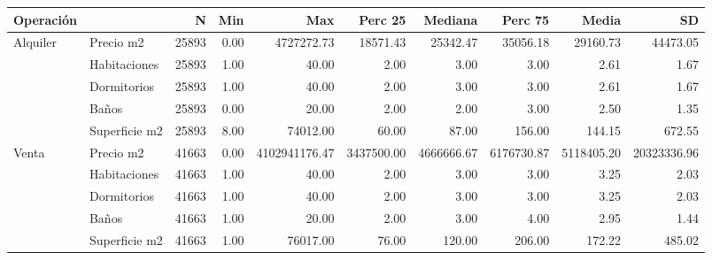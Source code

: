\begin{table}
\centering
\begin{tabular}[t]{llrrrrrrrr}
\toprule
Operación &   & N & Min & Max & Perc 25 & Mediana & Perc 75 & Media & SD\\
\midrule
Alquiler & Precio m2 & 25893 & \num{0.00} & \num{4727272.73} & \num{18571.43} & \num{25342.47} & \num{35056.18} & \num{29160.73} & \num{44473.05}\\
 & Habitaciones & 25893 & \num{1.00} & \num{40.00} & \num{2.00} & \num{3.00} & \num{3.00} & \num{2.61} & \num{1.67}\\
 & Dormitorios & 25893 & \num{1.00} & \num{40.00} & \num{2.00} & \num{3.00} & \num{3.00} & \num{2.61} & \num{1.67}\\
 & Baños & 25893 & \num{0.00} & \num{20.00} & \num{2.00} & \num{2.00} & \num{3.00} & \num{2.50} & \num{1.35}\\
 & Superficie m2 & 25893 & \num{8.00} & \num{74012.00} & \num{60.00} & \num{87.00} & \num{156.00} & \num{144.15} & \num{672.55}\\
Venta & Precio m2 & 41663 & \num{0.00} & \num{4102941176.47} & \num{3437500.00} & \num{4666666.67} & \num{6176730.87} & \num{5118405.20} & \num{20323336.96}\\
 & Habitaciones & 41663 & \num{1.00} & \num{40.00} & \num{2.00} & \num{3.00} & \num{3.00} & \num{3.25} & \num{2.03}\\
 & Dormitorios & 41663 & \num{1.00} & \num{40.00} & \num{2.00} & \num{3.00} & \num{3.00} & \num{3.25} & \num{2.03}\\
 & Baños & 41663 & \num{1.00} & \num{20.00} & \num{2.00} & \num{3.00} & \num{4.00} & \num{2.95} & \num{1.44}\\
 & Superficie m2 & 41663 & \num{1.00} & \num{76017.00} & \num{76.00} & \num{120.00} & \num{206.00} & \num{172.22} & \num{485.02}\\
\bottomrule
\end{tabular}
\end{table}
